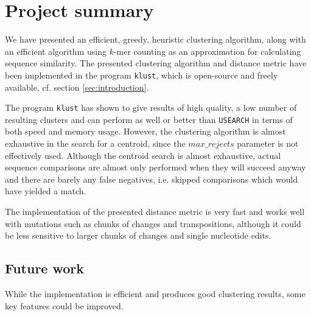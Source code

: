 \section{Project summary}
\label{sec:conclusions}

We have presented an efficient, greedy, heuristic clustering algorithm, along
with an efficient algorithm using $k$-mer counting as an approximation for
calculating sequence similarity. The presented clustering algorithm and
distance metric have been implemented in the program \texttt{klust}, which is
open-source and freely available, cf. section \ref{sec:introduction}.

The program \texttt{klust} has shown to give results of high quality, a low
number of resulting clusters and can perform as well or better than
\texttt{USEARCH} in terms of both speed and memory usage. However, the
clustering algorithm is almost exhaustive in the search for a centroid, since
the $max\_rejects$ parameter is not effectively used. Although the centroid
search is almost exhaustive, actual sequence comparisons are almost only
performed when they will succeed anyway and there are barely any false
negatives, i.e. skipped comparisons which would have yielded a match.

The implementation of the presented distance metric is very fast and works
well with mutations such as chunks of changes and transpositions, although it
could be less sensitive to larger chunks of changes and single nucleotide
edits.


\subsection{Future work}
\label{sec:future_work}

While the implementation is efficient and produces good clustering results,
some key features could be improved.

